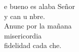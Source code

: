 \begin{cancion}%
	e bueno es alaba Señor\\
	y can u nbre.\\
	Anunc por la mañana \\
	 misericordia\\
	fidelidad cada che.\\
\end{cancion}%
